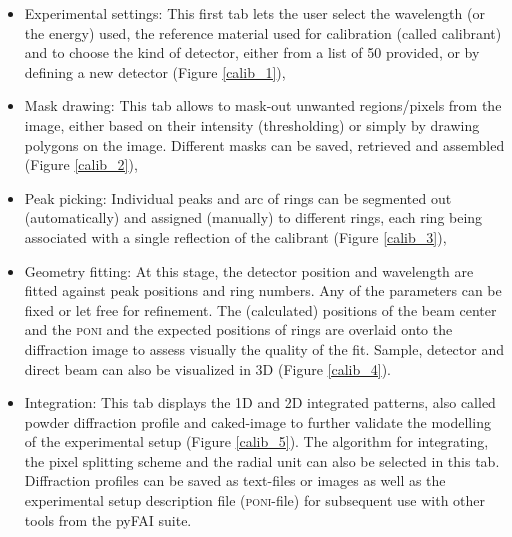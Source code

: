 \documentclass[preprint]{iucr}              %
\begin{document}
\begin{itemize}
  \item{Experimental settings:} This first tab lets the user select
  the wavelength (or the energy) used, the reference material used
  for calibration (called calibrant) and to choose the kind of detector, either from a 
  list of 50 provided, or by defining a new detector (Figure \ref{calib_1}),
  \item{Mask drawing:} This tab allows to mask-out unwanted regions/pixels from the
  image, either based on their intensity (thresholding) or simply by
  drawing polygons on the image. Different masks can be saved, retrieved and assembled (Figure \ref{calib_2}),
  \item{Peak picking:} Individual peaks and arc of rings can be segmented out
  (automatically) and assigned (manually) to different rings, each ring 
  being associated with a single reflection of the calibrant (Figure
  \ref{calib_3}),
  \item{Geometry fitting:} At this stage, the detector position and
  wavelength are fitted against peak positions and ring numbers. 
  Any of the  parameters can be fixed or let free for refinement.
  The (calculated) positions of the beam center and the \textsc{poni}
  and the expected positions of rings are overlaid onto the diffraction image
  to assess visually the quality of the fit. Sample, detector 
  and direct beam can also be visualized in 3D (Figure \ref{calib_4}). 
  \item{Integration:} This tab displays the 1D and 2D integrated patterns, also
  called powder diffraction profile and caked-image to further validate the
  modelling of the experimental setup (Figure \ref{calib_5}). 
  The algorithm for integrating, the pixel splitting scheme and the radial unit
  can also be selected in this tab. 
  Diffraction profiles can be saved as text-files or images as well as the
  experimental setup description file (\textsc{poni}-file) for subsequent use with other tools from
  the pyFAI suite.
\end{itemize}
\end{document}
